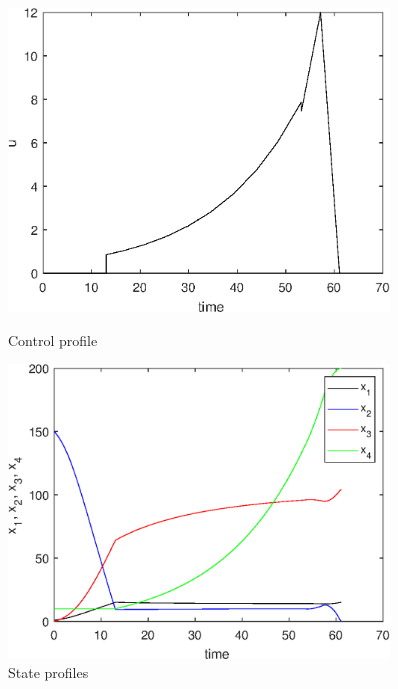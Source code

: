\begin{figure}[htb]
  \begin{minipage}[t]{0.5\linewidth}
    \centering
    \includegraphics[width=0.9\textwidth]{examples/problem_fed_batch/graphs/batch_control_dynopt.eps}
    \caption[]{Control profile}
    \label{contr_prof}
  \end{minipage}
  \begin{minipage}[t]{0.5\linewidth}
    \centering
    \includegraphics[width=0.9\textwidth]{examples/problem_fed_batch/graphs/batch_states_dynopt.eps}
    \caption[]{State profiles}
    \label{state_prof}
  \end{minipage}
\end{figure}
		
